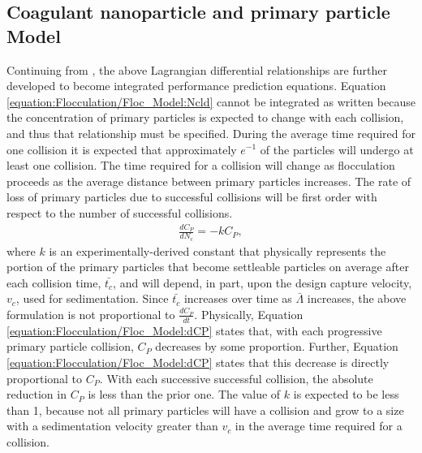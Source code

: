 \documentclass[letterpaper,10pt,english]{sphinxmanual}
\begin{document}
\subsection{Coagulant nanoparticle and primary particle Model}
\label{\detokenize{Flocculation/Floc_Model:coagulant-nanoparticle-and-primary-particle-model}}
Continuing from \label{\detokenize{Flocculation/Floc_Model:id3}}{\hyperref[\detokenize{Flocculation/Floc_Model:floc-model-pennock-theoretical-2016}]{\sphinxcrossref{{[}PCWSL16{]}}}}, the above Lagrangian differential relationships are further developed to become integrated performance prediction equations. Equation \eqref{equation:Flocculation/Floc_Model:Ncld} cannot be integrated as written because the concentration of primary particles is expected to change with each collision, and thus that relationship must be specified. During the average time required for one collision it is expected that approximately \(e^{-1}\) of the particles will undergo at least one collision. The time required for a collision will change as flocculation proceeds as the average distance between primary particles increases. The rate of loss of primary particles due to successful collisions will be first order with respect to the number of successful collisions.
\begin{equation}\label{equation:Flocculation/Floc_Model:dCP}
\begin{split}      \frac{dC_{P}}{dN_{c}}=-kC_{P},\end{split}
\end{equation}
where \(k\) is an experimentally-derived constant that physically represents the portion of the primary particles that become settleable particles on average after each collision time, \(\bar{t_c}\), and will depend, in part, upon the design capture velocity, \(v_c\), used for sedimentation. Since \(\bar{t_c}\) increases over time as \(\bar \Lambda\) increases, the above formulation is not proportional to \(\frac{dC_P}{dt}\). Physically, Equation \eqref{equation:Flocculation/Floc_Model:dCP} states that, with each progressive primary particle collision, \(C_P\) decreases by some proportion. Further, Equation \eqref{equation:Flocculation/Floc_Model:dCP} states that this decrease is directly proportional to \(C_P\). With each successive successful collision, the absolute reduction in \(C_P\) is less than the prior one. The value of \(k\) is expected to be less than 1, because not all primary particles will have a collision and grow to a size with a sedimentation velocity greater than \(v_c\) in the average time required for a collision.
\end{document}
